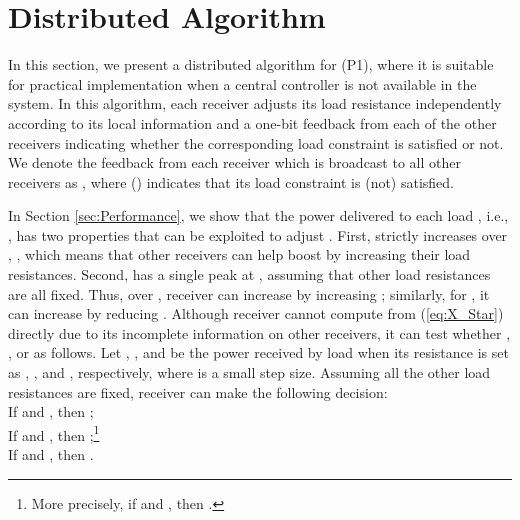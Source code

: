 \documentclass[onecolumn, a4size, 11pt]{IEEEtran}
\begin{document}
\section{Distributed  Algorithm} \label{Sec:dist-Alg} 
In this section, we present  a distributed algorithm for  (P1), where it is  suitable for practical implementation when a central controller is not available in the system.   
In this algorithm, each   receiver adjusts its load  resistance independently according to its local information and a  one-bit feedback from each of the other receivers indicating  whether the corresponding load  constraint is  satisfied or not. 
We denote the feedback from each receiver  which is broadcast to all other receivers  as ,  where  () indicates that its load constraint is (not)  satisfied. 


In Section \ref{sec:Performance}, we show  that   the power delivered to each load  , i.e., ,  has two properties that can be exploited to adjust  . 
First,  strictly increases over , , which means that other receivers can help boost  by increasing their load resistances.
Second,  has a single peak at , assuming that  other load  resistances are all fixed. 
Thus, over ,  receiver   can increase   by increasing  ; similarly, for , it can increase  by reducing . 
Although  receiver   cannot  compute   from (\ref{eq:X_Star}) directly due to its incomplete information on  other receivers, it can  test whether  , , or  as follows. 
Let , , and  be the power received by  load  when its resistance is  set as , , and , respectively, where  is a small step size.  Assuming all the other load resistances are fixed,  receiver  can make the following decision:\\
 If  and , then   ; \\
 If  and , then  ;\footnote{More precisely, if   and , then  .} \\
 If  and , then  .
\end{document}
